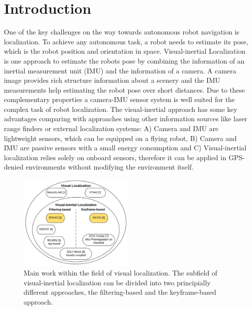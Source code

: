 \chapter{Introduction}
\label{sec:introduction}

One of the key challenges on the way towards autonomous robot navigation is localization. To achieve any autonomous task, a robot needs to estimate its pose, which is the robot position and orientation in space. Visual-inertial Localization is one approach to estimate the robots pose by combining the information of an inertial measurement unit (IMU) and the information of a camera. A camera image provides rich structure information about a scenery and the IMU measurements help estimating the robot pose over short distances. Due to these complementary properties a camera-IMU sensor system is well suited for the complex task of robot localization. The visual-inertial approach has some key advantages comparing with approaches using other information sources like laser range finders or external localization systems: A) Camera and IMU are lightweight sensors, which can be equipped on a flying robot, B) Camera and IMU are passive sensors with a small energy consumption and C) Visual-inertial localization relies solely on onboard sensors, therefore it can be applied in GPS-denied environments without modifying the environment itself. \\


\begin{figure}[h]
   \centering
   \includegraphics[width=0.5\textwidth]{images/state_of_the_art.png}
   \caption{Main work within the field of visual localization. The subfield of visual-inertial localization can be divided into two principially different approaches, the filtering-based and the keyframe-based approach.}
   \label{pics:state_of_the_art}
\end{figure}

